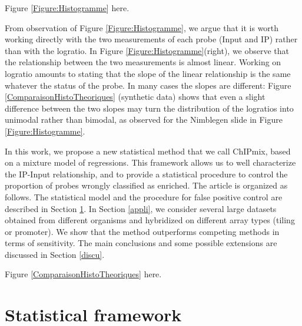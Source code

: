 \documentclass{bioinfo}
\begin{document}
\begin{center}
  Figure \ref{Figure:Histogramme} here.
\end{center}

From observation of Figure \ref{Figure:Histogramme}, we argue that it is
worth working directly
with the two measurements of each probe (Input and IP) rather than
with the logratio. In Figure \ref{Figure:Histogramme}(right), we
observe that the relationship between the two measurements is almost
linear. Working on logratio amounts to stating that the slope of the
linear relationship is the same whatever the status of the probe. In
many cases the slopes are different: Figure
\ref{ComparaisonHistoTheoriques} (synthetic data) shows that even a
slight difference between the two slopes may turn the distribution
of the logratios into unimodal rather than bimodal, as observed for
the Nimblegen slide in Figure \ref{Figure:Histogramme}.

In this work, we propose a new statistical method that we call
ChIPmix, based on a mixture model of regressions. This framework
allows us to well characterize the IP-Input relationship, and to
provide a statistical procedure to control the proportion of probes
wrongly classified as enriched. The article is organized as follows.
The statistical model and the procedure for false positive control
are described in Section \ref{methodo}.  In Section \ref{appli}, we
consider several large datasets obtained from different organisms
and hybridized on different array types (tiling or promoter). We
show that the method outperforms competing methods in terms of
sensitivity. The main conclusions and some possible extensions are
discussed in Section \ref{discu}.

\begin{center}
  Figure \ref{ComparaisonHistoTheoriques} here.
\end{center}




\section{Statistical framework}\label{methodo}
\end{document}
